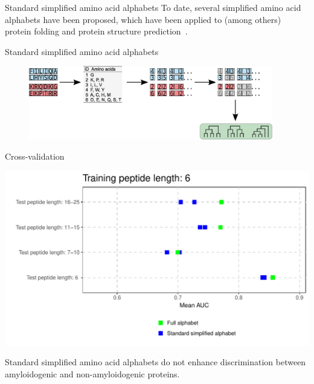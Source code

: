 \documentclass{beamer}\usepackage[]{graphicx}\usepackage[]{color}
\makeatletter
\def\maxwidth{ %
  \ifdim\Gin@nat@width>\linewidth
    \linewidth
  \else
    \Gin@nat@width
  \fi
}
\newenvironment{knitrout}{}{} %
\makeatother
\begin{document}
\begin{frame}{Standard simplified amino acid alphabets}
To date, several simplified amino acid alphabets have been proposed, which have been applied to (among others) protein folding and protein structure prediction~\citep{kosiol_new_2004, melo_accuracy_2006}.
  \end{frame}
  
    \begin{frame}{Standard simplified amino acid alphabets}
\begin{figure} 
\includegraphics[width=0.95\textwidth]{static_figure/ngram2.eps}
\end{figure}


  \end{frame}


    \begin{frame}{Cross-validation}
\begin{knitrout}
\color{fgcolor}

{\centering \includegraphics[width=\maxwidth]{figure/unnamed-chunk-10-1} 

}



\end{knitrout}

Standard simplified amino acid alphabets do not enhance discrimination between amyloidogenic and non-amyloidogenic proteins.
  
  \end{frame}
\end{document}
